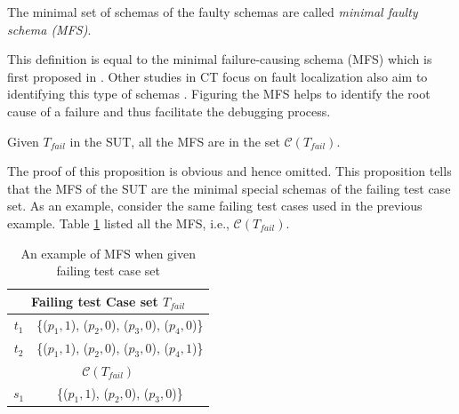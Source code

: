 \begin{definition} \label{de:faulty:minimal}
The minimal set of schemas of the faulty schemas are called \emph{minimal faulty schema (MFS)}.
\end{definition}

This definition is equal to the minimal failure-causing schema (MFS) which is first proposed in \cite{nie2011minimal}. Other studies in CT focus on fault localization also aim to identifying this type of schemas \cite{nie2011minimal,zhang2011characterizing,ghandehari2012identifying,niu2013identifying}. Figuring the MFS helps to identify the root cause of a failure and thus facilitate the debugging process.


\begin{proposition}\label{pro:minmalfaultyschemastests}
Given  $T_{fail}$ in the SUT, all the MFS are in the set $\mathcal{C}(T_{fail})$.
\end{proposition}

The proof of this proposition is obvious and hence omitted. This proposition tells that the MFS of the SUT are the minimal special schemas of the failing test case set. As an example, consider the same failing test cases used in the previous example. Table \ref{ex:minimalfaultyschemaspffailingtestset} listed all the MFS, i.e., $\mathcal{C}(T_{fail})$.


\begin{table}[htbp]
  \centering
  \caption{An example of MFS when given failing test case set}
      \label{ex:minimalfaultyschemaspffailingtestset}
    \begin{tabular}{|c|c|} \hline
  \multicolumn{2}{|c|}{\textbf{Failing test Case set $T_{fail}$}} \\ \hline
  $t_{1}$ & \{($p_{1}, 1$), ($p_{2}, 0$), ($p_{3}, 0$), ($p_{4}, 0$)\}\\
  $t_{2}$ & \{($p_{1}, 1$), ($p_{2}, 0$), ($p_{3}, 0$), ($p_{4}, 1$)\}\\ \hline
  \multicolumn{2}{|c|}{\textbf{ $\mathcal{C}(T_{fail})$ }}  \\ \hline
  $s_{1}$ & \{($p_{1}, 1$), ($p_{2}, 0$), ($p_{3}, 0$)\}  \\ \hline
    \end{tabular}%
\end{table}%




